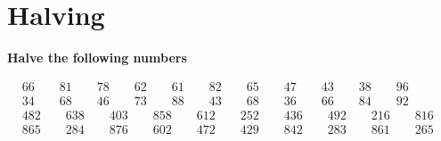 \documentclass{article}
\begin{document}
\newpage

\section{Halving}
\textbf{Halve the following numbers}

\bigskip

\(\begin{aligned}
	&66 \qquad 81 \qquad 78 \qquad 62 \qquad 61 \qquad 82 \qquad 65 \qquad 47 \qquad 43 \qquad 38 \qquad 96 \\[2em]
	&34 \qquad 68 \qquad 46 \qquad 73 \qquad 88 \qquad 43 \qquad 68 \qquad 36 \qquad 66 \qquad 84 \qquad 92 \\[2em]
	&482 \qquad 638 \qquad 403 \qquad 858 \qquad 612 \qquad 252 \qquad 436 \qquad 492 \qquad 216 \qquad 816 \\[2em]
	&865 \qquad 284 \qquad 876 \qquad 602 \qquad 472 \qquad 429 \qquad 842 \qquad 283 \qquad 861 \qquad 265 \\\\
\end{aligned}\)

\bigskip
\end{document}
